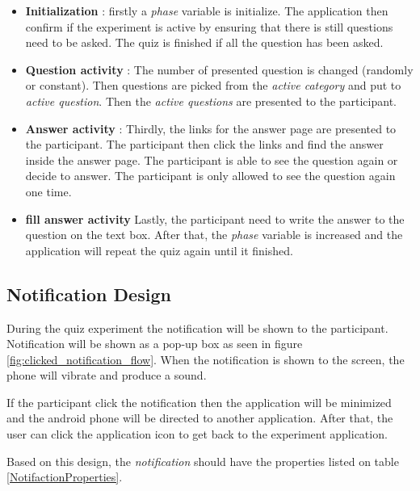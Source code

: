 \begin{itemize}
\item \textbf{Initialization} : firstly a \textit{phase} variable is initialize. The application then confirm if the experiment is active by ensuring that there is still questions need to be asked. The quiz is finished if all the question has been asked.
\item \textbf{Question activity} :  The number of presented question is changed (randomly or constant).
Then questions are picked from the \textit{active category} and put to \textit{active question}. Then the \textit{active questions} are presented to the participant.
\item \textbf{Answer activity} : Thirdly, the links for the answer page are presented to the participant. The participant then click the links and find the answer inside the answer page.
The participant is able to see the question again or decide to answer. The participant is only allowed to see the question again one time.
\item \textbf{fill answer activity} Lastly, the participant need to write the answer to the question on the text box.
After that, the \textit{phase} variable is increased and the application will repeat the quiz again until it finished.
\end{itemize}


\subsection{Notification Design}

During the quiz experiment the notification will be shown to the participant.
Notification will be shown as a pop-up box as seen in figure \ref{fig:clicked_notification_flow}.
When the notification is shown to the screen, the phone will vibrate and produce a sound.

 If the participant click the notification then the application will be minimized and the android phone will be directed to another application.
 After that, the user can click the application icon to get back to the experiment application.

Based on this design, the \textit{notification} should have the properties listed on table \ref{NotifactionProperties}.

